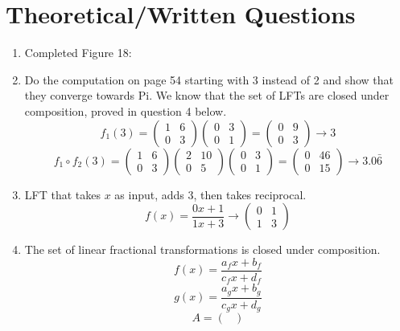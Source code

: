 \documentclass[a4paper,12pt]{article}
\begin{document}
\section{Theoretical/Written Questions}
\begin{enumerate}
\item Completed Figure 18:\\
\lstset{basicstyle=\footnotesize\ttfamily,breaklines=true}

\item Do the computation on page 54 starting with 3 instead of 2 and show that they converge towards Pi. We know that the set of LFTs are closed under composition, proved in question 4 below.\\
$$
f_1(3) = 
\begin{pmatrix}
1 & 6\\
0 & 3
\end{pmatrix}
\begin{pmatrix}
0 & 3\\
0 & 1
\end{pmatrix}
=
\begin{pmatrix}
0 & 9\\
0 & 3
\end{pmatrix}
\rightarrow 3
$$
$$
f_1 \circ f_2(3) = 
\begin{pmatrix}
1 & 6\\
0 & 3
\end{pmatrix}
\begin{pmatrix}
2 & 10\\
0 & 5
\end{pmatrix}
\begin{pmatrix}
0 & 3\\
0 & 1
\end{pmatrix}
=
\begin{pmatrix}
0 & 46\\
0 & 15
\end{pmatrix}
\rightarrow 3.0\bar{6}
$$
\newpage
\item LFT that takes $x$ as input, adds 3, then takes reciprocal.\\
$$
f(x) = \frac{0x + 1}{1x + 3}
\rightarrow
\begin{pmatrix}
0 & 1\\
1 & 3
\end{pmatrix} $$
\item The set of linear fractional transformations is closed under composition.\\
$$f(x) = \frac{a_fx + b_f}{c_fx+d_f}$$
$$g(x) = \frac{a_gx + b_g}{c_gx+d_g}$$
$$ A = \begin{pmatrix}

\end{pmatrix}$$
\end{enumerate}
\end{document}
